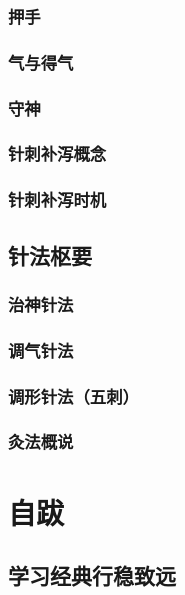 \documentclass[
]{book}
\begin{document}
\subsection{押手}\label{ux62bcux624b}

\subsection{气与得气}\label{ux6c14ux4e0eux5f97ux6c14}

\subsection{守神}\label{ux5b88ux795e}

\subsection{针刺补泻概念}\label{ux9488ux523aux8865ux6cfbux6982ux5ff5}

\subsection{针刺补泻时机}\label{ux9488ux523aux8865ux6cfbux65f6ux673a}

\section{针法枢要}\label{ux9488ux6cd5ux67a2ux8981}

\subsection{治神针法}\label{ux6cbbux795eux9488ux6cd5}

\subsection{调气针法}\label{ux8c03ux6c14ux9488ux6cd5}

\subsection{调形针法（五刺）}\label{ux8c03ux5f62ux9488ux6cd5ux4e94ux523a}

\subsection{灸法概说}\label{ux7078ux6cd5ux6982ux8bf4}

\chapter*{自跋}\label{ux81eaux8dcb}

\section*{学习经典行稳致远}\label{ux5b66ux4e60ux7ecfux5178ux884cux7a33ux81f4ux8fdc}


\end{document}
